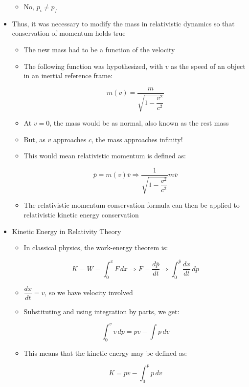 \begin{itemize}
    \begin{itemize}

      \item No, $p_i \neq p_f$

    \end{itemize}

  \item Thus, it was necessary to modify the mass in relativistic dynamics so that conservation of momentum holds true

    \begin{itemize}

      \item The new mass had to be a function of the velocity

      \item The following function was hypothesized, with $v$ as the speed of an object in an inertial reference frame:

        $$\boxed{m(v)=\frac{m}{\sqrt{1-\dfrac{v^2}{c^2}}}}$$

      \item At $v=0$, the mass would be as normal, also known as the rest mass

      \item But, as $v$ approaches $c$, the mass approaches infinity!

      \item This would mean relativistic momentum is defined as:

        $$\overline{p}=m(v)\overline{v}\Rightarrow \frac{1}{\sqrt{1-\dfrac{v^2}{c^2}}}m\overline{v}$$

      \item The relativistic momentum conservation formula can then be applied to relativistic kinetic energy conservation

    \end{itemize}

  \item Kinetic Energy in Relativity Theory

    \begin{itemize}

      \item In classical physics, the work-energy theorem is:

        $$K=W=\int_0^x F\,dx\Rightarrow F=\frac{d\overline{p}}{dt}\Rightarrow \int_0^{\overline{p}} \frac{dx}{dt}\,dp$$

      \item $\dfrac{dx}{dt}=v$, so we have velocity involved

      \item Substituting and using integration by parts, we get:

        $$\int_0^v v\,dp=pv-\int p\,dv$$

      \item This means that the kinetic energy may be defined as:

        $$K=pv-\int_0^p p\,dv$$

    \end{itemize}

\end{itemize}



